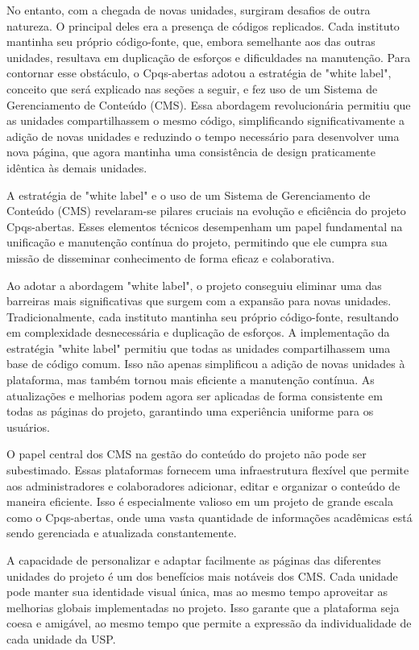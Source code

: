No entanto, com a chegada de novas unidades, surgiram desafios de outra natureza. O principal deles era a presença de códigos replicados. Cada instituto mantinha seu próprio código-fonte, que, embora semelhante aos das outras unidades, resultava em duplicação de esforços e dificuldades na manutenção. Para contornar esse obstáculo, o Cpqs-abertas adotou a estratégia de "white label", conceito que será explicado nas seções a seguir, e fez uso de um Sistema de Gerenciamento de Conteúdo (CMS). Essa abordagem revolucionária permitiu que as unidades compartilhassem o mesmo código, simplificando significativamente a adição de novas unidades e reduzindo o tempo necessário para desenvolver uma nova página, que agora mantinha uma consistência de design praticamente idêntica às demais unidades.

A estratégia de "white label" e o uso de um Sistema de Gerenciamento de Conteúdo (CMS) revelaram-se pilares cruciais na evolução e eficiência do projeto Cpqs-abertas. Esses elementos técnicos desempenham um papel fundamental na unificação e manutenção contínua do projeto, permitindo que ele cumpra sua missão de disseminar conhecimento de forma eficaz e colaborativa.

Ao adotar a abordagem "white label", o projeto conseguiu eliminar uma das barreiras mais significativas que surgem com a expansão para novas unidades. Tradicionalmente, cada instituto mantinha seu próprio código-fonte, resultando em complexidade desnecessária e duplicação de esforços. A implementação da estratégia "white label" permitiu que todas as unidades compartilhassem uma base de código comum. Isso não apenas simplificou a adição de novas unidades à plataforma, mas também tornou mais eficiente a manutenção contínua. As atualizações e melhorias podem agora ser aplicadas de forma consistente em todas as páginas do projeto, garantindo uma experiência uniforme para os usuários.

O papel central dos CMS na gestão do conteúdo do projeto não pode ser subestimado. Essas plataformas fornecem uma infraestrutura flexível que permite aos administradores e colaboradores adicionar, editar e organizar o conteúdo de maneira eficiente. Isso é especialmente valioso em um projeto de grande escala como o Cpqs-abertas, onde uma vasta quantidade de informações acadêmicas está sendo gerenciada e atualizada constantemente.

A capacidade de personalizar e adaptar facilmente as páginas das diferentes unidades do projeto é um dos benefícios mais notáveis dos CMS. Cada unidade pode manter sua identidade visual única, mas ao mesmo tempo aproveitar as melhorias globais implementadas no projeto. Isso garante que a plataforma seja coesa e amigável, ao mesmo tempo que permite a expressão da individualidade de cada unidade da USP.

